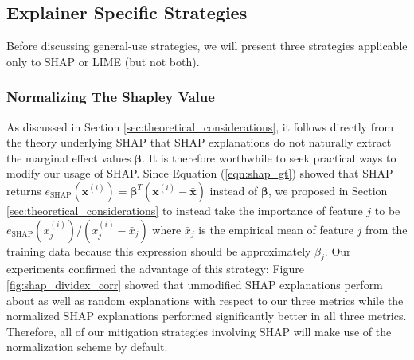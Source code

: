 \documentclass[12pt]{article}  %
\begin{document}
        
     


    \subsection{Explainer Specific Strategies}
        Before discussing general-use strategies, we will present three strategies applicable only to SHAP or LIME (but not both). 

            \subsubsection{Normalizing The Shapley Value}
                As discussed in Section \ref{sec:theoretical_considerations}, it follows directly from the theory underlying SHAP that SHAP explanations do not naturally extract the marginal effect values $\boldsymbol{\beta}$. It is therefore worthwhile to seek practical ways to modify our usage of SHAP. Since Equation (\ref{eqn:shap_gt}) showed that SHAP returns $e_{\text{SHAP}}(\mathbf{x}^{(i)})=\boldsymbol{\beta}^T(\mathbf{x}^{(i)} - \bar{\mathbf{x}})$ instead of $\boldsymbol{\beta}$, we proposed in Section \ref{sec:theoretical_considerations} to instead take the importance of feature $j$ to be $e_{\text{SHAP}}(x^{(i)}_j) / (x^{(i)}_j - \bar{x}_j)$ where $\bar{x}_j$ is the empirical mean of feature $j$ from the training data because this expression should be approximately $\beta_j$. Our experiments confirmed the advantage of this strategy: Figure \ref{fig:shap_dividex_corr} showed that unmodified SHAP explanations perform about as well as random explanations with respect to our three metrics while the normalized SHAP explanations performed significantly better in all three metrics. Therefore, all of our mitigation strategies involving SHAP will make use of the normalization scheme by default.

\end{document}
